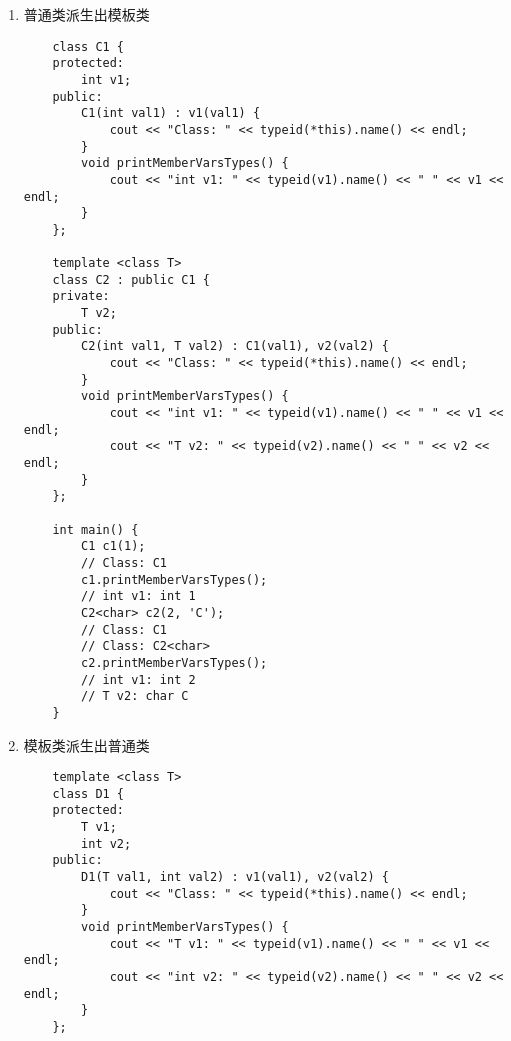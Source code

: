 \documentclass[UTF8]{ctexart}
\begin{document}
\begin{enumerate}
\begin{verbatim}
    template <class T>
    class B2 : public B1<int, double> {
    private:
        T v3;
    public:
        B2(int val1, double val2, T val3) : B1<int, double>(val1, val2), v3(val3) {
            cout << "Class: " << typeid(*this).name() << endl;
        }
        void printMemberVarsTypes() {
            // no need to use this pointer to access v1, v2 here
            cout << "int v1: " << typeid(v1).name() << " " << v1 << endl;
            cout << "double v2: " << typeid(v2).name() << " " << v2 << endl;
            cout << "T3 v3: " << typeid(v3).name() << " " << v3 << endl;
        }
    };

    int main() {
        B1<double, char *> b1(1.0, "hello");
        // Class: B1<double, char*>
        b1.printMemberVarsTypes();
        // T1 v1: double 1
        // T2 v2: char* hello
        B2<char> b2(3, 4.0, 'E');
        // Class: B1<int, double>
        // Class: B2<char>
        b2.printMemberVarsTypes();
        // int v1: int 3
        // double v2: double 4
        // T3 v3: char E
        return 0;
    }
    \end{verbatim}
    \item 普通类派生出模板类
    \begin{verbatim}
    class C1 {
    protected:
        int v1;
    public:
        C1(int val1) : v1(val1) {
            cout << "Class: " << typeid(*this).name() << endl;
        }
        void printMemberVarsTypes() {
            cout << "int v1: " << typeid(v1).name() << " " << v1 << endl;
        }
    };

    template <class T>
    class C2 : public C1 {
    private:
        T v2;
    public:
        C2(int val1, T val2) : C1(val1), v2(val2) {
            cout << "Class: " << typeid(*this).name() << endl;
        }
        void printMemberVarsTypes() {
            cout << "int v1: " << typeid(v1).name() << " " << v1 << endl;
            cout << "T v2: " << typeid(v2).name() << " " << v2 << endl;
        }
    };

    int main() {
        C1 c1(1);
        // Class: C1
        c1.printMemberVarsTypes();
        // int v1: int 1
        C2<char> c2(2, 'C');
        // Class: C1
        // Class: C2<char>
        c2.printMemberVarsTypes();
        // int v1: int 2
        // T v2: char C
    }
    \end{verbatim}
    \item 模板类派生出普通类
    \begin{verbatim}
    template <class T>
    class D1 {
    protected:
        T v1;
        int v2;
    public:
        D1(T val1, int val2) : v1(val1), v2(val2) {
            cout << "Class: " << typeid(*this).name() << endl;
        }
        void printMemberVarsTypes() {
            cout << "T v1: " << typeid(v1).name() << " " << v1 << endl;
            cout << "int v2: " << typeid(v2).name() << " " << v2 << endl;
        }
    };


\end{verbatim}
\end{enumerate}
\end{document}
